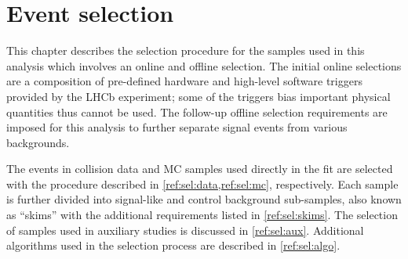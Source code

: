 \chapter{Event selection}
\label{ref:sel}

This chapter describes the selection procedure for the samples used in this
analysis which involves an online and offline selection.
The initial online selections are a composition of
pre-defined hardware and high-level software triggers provided by the LHCb
experiment;
some of the triggers bias important physical quantities thus cannot be used.
The follow-up offline selection requirements are imposed for this analysis
to further separate signal events from various backgrounds.

The events in collision data and MC samples used directly in the fit are
selected with the procedure
described in \cref{ref:sel:data,ref:sel:mc}, respectively.
Each sample is further divided into signal-like and control background
sub-samples, also known as ``skims''
with the additional requirements listed in \cref{ref:sel:skims}.
The selection of samples used in auxiliary studies is discussed in
\cref{ref:sel:aux}.
Additional algorithms used in the selection process are described in
\cref{ref:sel:algo}.







